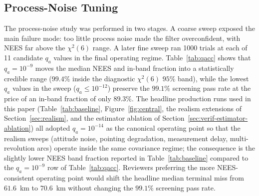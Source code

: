 \documentclass[10pt,twocolumn]{article}
\newcommand{\chisq}{\chi^2}
\begin{document}
\subsection{Process-Noise Tuning}
\label{sec:process-tuning}
The process-noise study was performed in two stages.  A coarse sweep exposed the main failure mode: too little process noise made the filter overconfident, with NEES far above the $\chisq(6)$ range.  A later fine sweep ran 1000 trials at each of 11 candidate $q_a$ values in the final operating regime.  Table~\ref{tab:qacc} shows that $q_a=10^{-9}$ moves the median NEES and in-band fraction into a statistically credible range ($99.4\%$ inside the diagnostic $\chisq(6)$ $95\%$ band), while the lowest $q_a$ values in the sweep ($q_a\le 10^{-12}$) preserve the $99.1\%$ screening pass rate at the price of an in-band fraction of only $89.3\%$.  The headline production runs used in this paper (Table~\ref{tab:baseline}, Figure~\ref{fig:central}, the realism extensions of Section~\ref{sec:realism}, and the estimator ablation of Section~\ref{sec:verif-estimator-ablation}) all adopted $q_a=10^{-14}$ as the canonical operating point so that the realism sweeps (attitude noise, pointing degradation, measurement delay, multi-revolution arcs) operate inside the same covariance regime; the consequence is the slightly lower NEES band fraction reported in Table~\ref{tab:baseline} compared to the $q_a=10^{-9}$ row of Table~\ref{tab:qacc}.  Reviewers preferring the more NEES-consistent operating point would shift the headline median terminal miss from $61.6$~km to $70.6$~km without changing the $99.1\%$ screening pass rate.
\end{document}
